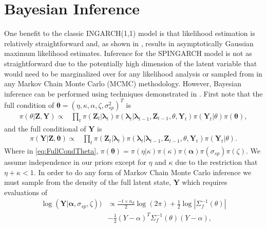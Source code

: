 \documentclass[11pt]{isuthesis}
\begin{document}
\section{Bayesian Inference}\label{Sec:Bayes}
One benefit to the classic INGARCH(1,1) model is that likelihood estimation is relatively straightforward and, as shown in \cite{fokianos2009poisson}, results in asymptotically Gaussian maximum likelihood estimates.  Inference for the SPINGARCH model is not as straightforward due to the potentially high dimension of the latent variable that would need to be marginalized over for any likelihood analysis or sampled from in any Markov Chain Monte Carlo (MCMC) methodology.  However, Bayesian inference can be performed using techniques demonstrated in \cite{joseph}. First note that the full condition of $\boldsymbol{\theta}=\left(\eta,\kappa,\alpha,\zeta,\sigma^2_{sp}\right)^T$ is
\begin{align}
\pi(\theta | \boldsymbol{Z},\boldsymbol{Y})\propto &  \prod_t\pi(\boldsymbol{Z}_t|\boldsymbol{\lambda}_t)\pi(\boldsymbol{\lambda}_t|\boldsymbol{\lambda}_{t-1},\boldsymbol{Z}_{t-1},\theta,\boldsymbol{Y}_t)\pi(\boldsymbol{Y}_t|\theta)
\pi(\boldsymbol{\theta})\label{eq:FullCondTheta},
\end{align}
and the full conditional of $\boldsymbol{Y}$ is
\begin{align}
\pi(\boldsymbol{Y} | \boldsymbol{Z},\boldsymbol{\theta})\propto &  \prod_t\pi(\boldsymbol{Z}_t|\boldsymbol{\lambda}_t)\pi(\boldsymbol{\lambda}_t|\boldsymbol{\lambda}_{t-1},\boldsymbol{Z}_{t-1},\theta,\boldsymbol{Y}_t)\pi(\boldsymbol{Y}_t|\theta).
\end{align}
Where in \eqref{eq:FullCondTheta}, $\pi(\boldsymbol{\theta})=\pi(\eta|\kappa)\pi(\kappa)\pi(\boldsymbol{\alpha})\pi(\sigma_{sp})\pi(\zeta)$.  We assume independence in our priors except for $\eta$ and $\kappa$ due to the restriction that $\eta+\kappa <1$.  In order to do any form of Markov Chain Monte Carlo inference we must sample from the density of the full latent state, $\boldsymbol{Y}$ which requires evaluations of 
\begin{align}
\log(\boldsymbol{Y}|\boldsymbol{\alpha},\sigma_{sp},\zeta)) & \propto \frac{-t \times n_d}{2}\log(2 \pi) + \frac{1}{2} \log | \Sigma_f^{-1}(\theta)|\nonumber\\
& - \frac{1}{2}(Y-\alpha)^T\Sigma_f^{-1}(\theta)(Y-\alpha) \label{eq:log Y},
\end{align}
\end{document}
